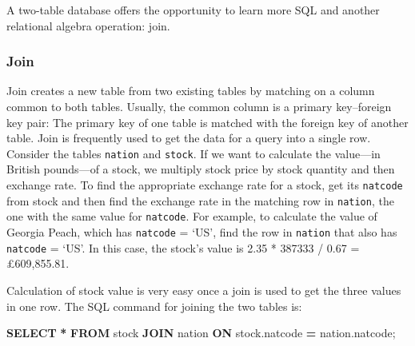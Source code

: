\documentclass[
]{article}
\newenvironment{Shaded}{\begin{snugshade}}{\end{snugshade}}
\newcommand{\KeywordTok}[1]{\textcolor[rgb]{0.13,0.29,0.53}{\textbf{#1}}}
\newcommand{\NormalTok}[1]{#1}
\newcommand{\OperatorTok}[1]{\textcolor[rgb]{0.81,0.36,0.00}{\textbf{#1}}}
\begin{document}
A two-table database offers the opportunity to learn more SQL and
another relational algebra operation: join.

\hypertarget{join}{%
\subsubsection{Join}\label{join}}

Join creates a new table from two existing tables by matching on a
column common to both tables. Usually, the common column is a primary
key--foreign key pair: The primary key of one table is matched with the
foreign key of another table. Join is frequently used to get the data
for a query into a single row. Consider the tables \texttt{nation} and
\texttt{stock}. If we want to calculate the value---in British
pounds---of a stock, we multiply stock price by stock quantity and then
exchange rate. To find the appropriate exchange rate for a stock, get
its \texttt{natcode} from stock and then find the exchange rate in the
matching row in \texttt{nation}, the one with the same value for
\texttt{natcode}. For example, to calculate the value of Georgia Peach,
which has \texttt{natcode} = `US', find the row in \texttt{nation} that
also has \texttt{natcode} = `US'. In this case, the stock's value is
2.35 * 387333 / 0.67 = £609,855.81.

Calculation of stock value is very easy once a join is used to get the
three values in one row. The SQL command for joining the two tables is:

\begin{Shaded}
\begin{Highlighting}[]
\KeywordTok{SELECT} \OperatorTok{*} \KeywordTok{FROM}\NormalTok{ stock }\KeywordTok{JOIN}\NormalTok{ nation}
    \KeywordTok{ON}\NormalTok{ stock.natcode }\OperatorTok{=}\NormalTok{ nation.natcode;}
\end{Highlighting}
\end{Shaded}
\end{document}
